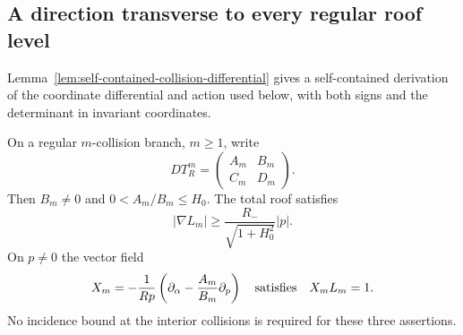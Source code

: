 \subsection{A direction transverse to every regular roof level}
Lemma~\ref{lem:self-contained-collision-differential} gives a
self-contained derivation of the coordinate differential and action
used below, with both signs and the determinant in invariant coordinates.
\begin{lemma}\label{lem:roof-transverse-direction}
On a regular $m$-collision branch, $m\ge1$, write
\[
 D T_R^m=\begin{pmatrix}A_m&B_m\\ C_m&D_m\end{pmatrix}.
\]
Then $B_m\ne0$ and $0<A_m/B_m\le H_0$. The total roof satisfies
\begin{equation}\label{eq:uniform-roof-gradient}
 |\nabla L_m|\ge \frac{R_-}{\sqrt{1+H_0^2}}|p|.
\end{equation}
On $p\ne0$ the vector field
\begin{equation}\label{eq:roof-transverse-field}
 X_m=-\frac1{Rp}\left(\partial_\alpha-
                      \frac{A_m}{B_m}\partial_p\right)
 \quad\hbox{satisfies}\quad X_m L_m=1.
\end{equation}
No incidence bound at the interior collisions is required for these
three assertions.
\end{lemma}

